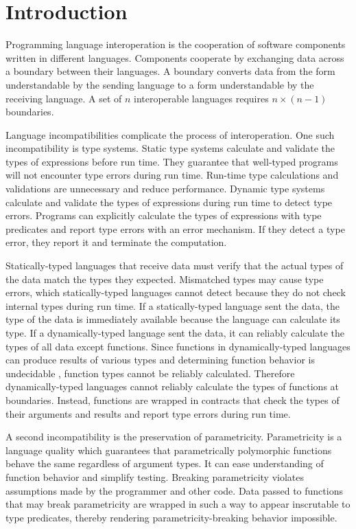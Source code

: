\chapter{Introduction}

Programming language interoperation is the cooperation of software components written in different languages.  Components cooperate by exchanging data across a boundary between their languages.  A boundary converts data from the form understandable by the sending language to a form understandable by the receiving language.  A set of $n$ interoperable languages requires $n\times(n-1)$ boundaries.

Language incompatibilities complicate the process of interoperation.  One such incompatibility is type systems.  Static type systems calculate and validate the types of expressions before run time.  They guarantee that well-typed programs will not encounter type errors during run time.  Run-time type calculations and validations are unnecessary and reduce performance.  Dynamic type systems calculate and validate the types of expressions during run time to detect type errors.  Programs can explicitly calculate the types of expressions with type predicates and report type errors with an error mechanism.  If they detect a type error, they report it and terminate the computation.

Statically-typed languages that receive data must verify that the actual types of the data match the types they expected.  Mismatched types may cause type errors, which statically-typed languages cannot detect because they do not check internal types during run time.  If a statically-typed language sent the data, the type of the data is immediately available because the language can calculate its type.  If a dynamically-typed language sent the data, it can reliably calculate the types of all data except functions.  Since functions in dynamically-typed languages can produce results of various types and determining function behavior is undecidable \cite{blume04}, function types cannot be reliably calculated.  Therefore dynamically-typed languages cannot reliably calculate the types of functions at boundaries.  Instead, functions are wrapped in contracts \cite{findler02} that check the types of their arguments and results and report type errors during run time.

A second incompatibility is the preservation of parametricity.  Parametricity is a language quality which guarantees that parametrically polymorphic functions behave the same regardless of argument types.  It can ease understanding of function behavior and simplify testing.  Breaking parametricity violates assumptions made by the programmer and other code.  Data passed to functions that may break parametricity are wrapped in such a way to appear inscrutable to type predicates, thereby rendering parametricity-breaking behavior impossible.

